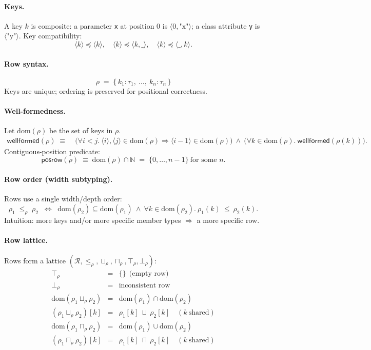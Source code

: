 \paragraph{Keys.}
A key $k$ is composite: a parameter \texttt{x} at position $0$ is $\langle 0,\text{"x"} \rangle$; a class attribute \texttt{y} is $\langle \text{"y"} \rangle$.
Key compatibility:
\[
\langle k \rangle \preccurlyeq \langle k \rangle,\quad
\langle k \rangle \preccurlyeq \langle k, \_ \rangle,\quad
\langle k \rangle \preccurlyeq \langle \_, k \rangle.
\]

\paragraph{Row syntax.}
\[
\rho \;=\; \{\, k_1 : \tau_1,\ \dots,\ k_n : \tau_n \,\}
\]
Keys are unique; ordering is preserved for positional correctness.

\paragraph{Well-formedness.}
Let $\mathrm{dom}(\rho)$ be the set of keys in $\rho$.
\begin{align}
\mathsf{wellformed}(\rho) \;\equiv\;&
\big(\forall i<j.\ \langle i\rangle,\langle j\rangle \in \mathrm{dom}(\rho) \Rightarrow \langle i{-}1\rangle \in \mathrm{dom}(\rho)\big)\ \wedge\ 
\big(\forall k\in\mathrm{dom}(\rho).\ \mathsf{wellformed}(\rho(k))\big).
\end{align}
Contiguous-position predicate:
\[
\mathsf{posrow}(\rho) \;\equiv\; \mathrm{dom}(\rho)\cap\mathbb{N} \;=\; \{0,\dots,n{-}1\}\ \text{for some } n.
\]

\paragraph{Row order (width subtyping).}
Rows use a single width/depth order:
\[
\rho_1 \;\le_\rho\; \rho_2 \;\;\iff\;\;
\mathrm{dom}(\rho_2)\subseteq \mathrm{dom}(\rho_1)
\ \wedge\
\forall k\in\mathrm{dom}(\rho_2).\ \rho_1(k)\ \le\ \rho_2(k).
\]
Intuition: more keys and/or more specific member types $\Rightarrow$ a more specific row.

\paragraph{Row lattice.}
Rows form a lattice $(\mathcal{R}, \le_\rho, \sqcup_\rho, \sqcap_\rho, \top_\rho, \bot_\rho)$:
\[
\begin{array}{lcl}
\top_\rho &=& \{\}\ \ \text{(empty row)}\\[0.2em]
\bot_\rho &=& \text{inconsistent row}\\[0.2em]
\mathrm{dom}(\rho_1 \sqcup_\rho \rho_2) &=& \mathrm{dom}(\rho_1)\cap\mathrm{dom}(\rho_2)\\
(\rho_1 \sqcup_\rho \rho_2)[k] &=& \rho_1[k]\ \sqcup\ \rho_2[k]\quad (k\ \text{shared})\\[0.2em]
\mathrm{dom}(\rho_1 \sqcap_\rho \rho_2) &=& \mathrm{dom}(\rho_1)\cup\mathrm{dom}(\rho_2)\\
(\rho_1 \sqcap_\rho \rho_2)[k] &=& \rho_1[k]\ \sqcap\ \rho_2[k]\quad (k\ \text{shared})
\end{array}
\]

